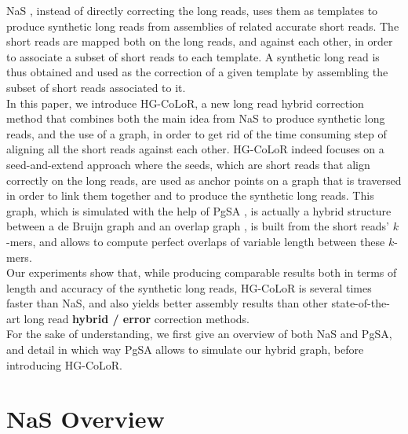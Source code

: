 \documentclass[long, final]{jobim2017}
\begin{document}
\indent NaS \cite{Madoui2015}, instead of directly correcting the long reads, uses them as templates to produce synthetic long reads from assemblies of related accurate short reads. The short reads are 
mapped both on the long reads, and against each other, in order to associate a subset of short reads to each template. A synthetic long read is thus obtained and used as the correction of a given template by assembling the subset of short reads associated to it. \\
\indent In this paper, we introduce HG-CoLoR, a new long read hybrid correction method that combines both the main idea from NaS to produce synthetic long reads, and the use of a graph, in order to get rid of the time consuming step of aligning all the short reads against each other. HG-CoLoR indeed focuses on a seed-and-extend approach where the seeds, which are short reads that align correctly on the long reads, are used as anchor points on a graph that is traversed in order to link them together and to produce the synthetic long reads. This graph, which is simulated with the help of PgSA \cite{Kowalski2015}, is actually a hybrid structure between a de Bruijn graph and an overlap graph \cite{Ehrenfecht2004}, is built from the short reads' $k$-mers, and allows to compute perfect overlaps of variable length between these $k$-mers. \\
\indent Our experiments show that, while producing comparable results both in terms of length and accuracy of the synthetic long reads, HG-CoLoR is several times faster than NaS, and also yields better assembly results than other state-of-the-art long read \textbf{hybrid / error} correction methods. \\
\indent For the sake of understanding, we first give an overview of both NaS and PgSA, and detail in which way PgSA allows to simulate our hybrid graph, before introducing HG-CoLoR.

\section{NaS Overview}
\label{sec:NaSO}
\end{document}
